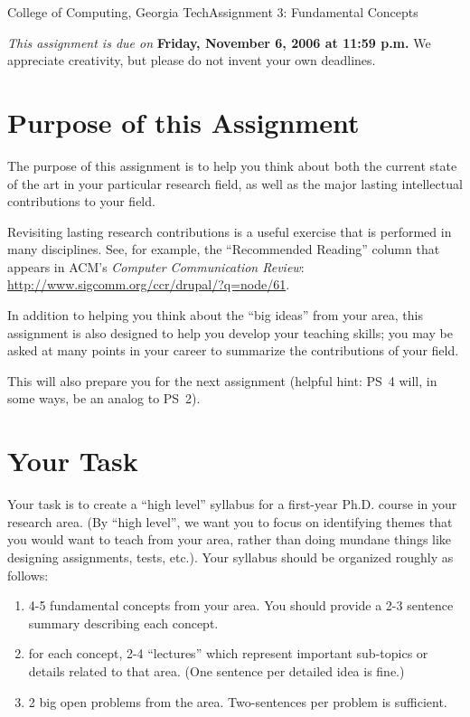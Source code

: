 \documentclass[11pt]{article}
\begin{document}


{College of Computing, Georgia Tech}{Assignment 3: Fundamental Concepts}

{\em This assignment is due on} {\bf Friday, November 6, 2006 at 11:59
  p.m.}  We appreciate creativity, but please do not invent your own
  deadlines.  


\section{Purpose of this Assignment}

The purpose of this assignment is to help you think about both the
current state of the art in your particular research field, as well as
the major lasting intellectual contributions to your field.  

Revisiting lasting research contributions is a useful exercise that is
performed in many disciplines.  See, for example, the ``Recommended
Reading'' column that appears in ACM's {\em Computer Communication
  Review}:  \url{http://www.sigcomm.org/ccr/drupal/?q=node/61}.

In addition to helping you think about the ``big ideas'' from your area,
this assignment is also designed to help you develop your teaching
skills; you may be asked at many points in your career to summarize the
contributions of your field.

This will also prepare you for the next assignment (helpful hint: PS~4
will, in some ways, be an analog to PS~2).

\section{Your Task}

Your task is to create a ``high level'' syllabus for a first-year
Ph.D. course in your research area.  (By ``high level'', we want you to
focus on identifying themes that you would want to teach from your area,
rather than doing mundane things like designing assignments, tests,
etc.).  Your syllabus should be organized roughly as follows:

\begin{enumerate}
\item 4-5 fundamental concepts from your area.  You should provide a 2-3
  sentence summary describing each concept.
\item for each concept, 2-4 ``lectures'' which represent important
  sub-topics or details related to that area.  (One sentence per
  detailed idea is fine.)
\item 2 big open problems from the area. Two-sentences per problem is
  sufficient. 
\end{enumerate}
\end{document}
